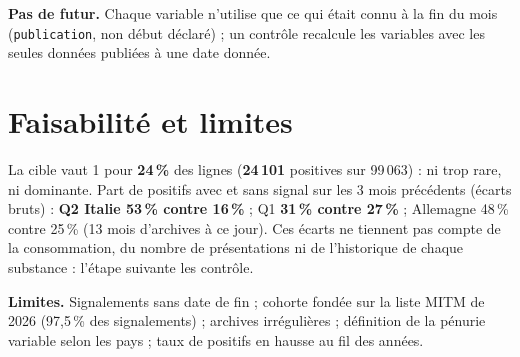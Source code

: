 \textbf{Pas de futur.} Chaque variable n'utilise que ce qui était connu à la fin du mois (\texttt{publication}, non début déclaré) ;
un contrôle recalcule les variables avec les seules données publiées à une date donnée.

\section{Faisabilité et limites}

La cible vaut 1 pour \textbf{24\,\%} des lignes (\textbf{24\,101} positives sur 99\,063) : ni trop rare, ni dominante.
Part de positifs avec et sans signal sur les 3 mois précédents (écarts bruts) : \textbf{Q2 Italie 53\,\% contre 16\,\%} ;
Q1 \textbf{31\,\% contre 27\,\%} ; Allemagne 48\,\% contre 25\,\% (13 mois d'archives à ce jour). Ces écarts ne tiennent pas
compte de la consommation, du nombre de présentations ni de l'historique de chaque substance : l'étape suivante les contrôle.

\textbf{Limites.} Signalements sans date de fin ; cohorte fondée sur la liste MITM de 2026 (97,5\,\% des signalements) ;
archives irrégulières ; définition de la pénurie variable selon les pays ; taux de positifs en hausse au fil des années.
